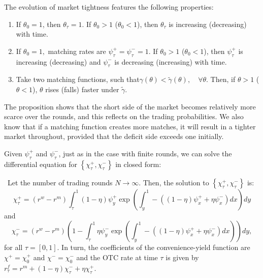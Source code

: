 \documentclass[12pt,american,english,notitlepage]{article}
\begin{document}
\begin{proposition}\label{prop:theta.ode.props}
The evolution of market tightness features the following properties:
\begin{enumerate}
  \renewcommand{\labelenumi}{\roman{enumi}.}

\item If $\theta_{0}=1$, then $\theta_{\tau}=1$. If $\theta_{0}>1$ ($\theta_{0}<1$),
then $\theta_{\tau}$ is increasing (decreasing) with time.
\item If $\theta_{0}=1,$ matching rates are $\psi_{\tau}^{+}=\psi_{\tau}^{-}=1.$
If $\theta_{0}>1$ ($\theta_{0}<1$), then $\psi_{\tau}^{+}$ is increasing
(decreasing) and $\psi_{\tau}^{-}$ is decreasing (increasing) with
time.
\item Take two matching functions, such that$\gamma\left(\theta\right)<\tilde{\gamma}\left(\theta\right),\quad\forall\theta$.
Then, if $\theta>1$ ($\theta<1$), $\theta$ rises (falls) faster
under $\tilde{\gamma}$.
\end{enumerate}
\end{proposition}The proposition shows that the short side of the
market becomes relatively more scarce over the rounds, and this reflects
on the trading probabilities. We also know that if a matching function creates
more matches, it will result in a tighter market throughout, provided
that the deficit side exceeds one initially. 

Given $\psi_{\tau}^{+}$ and $\psi_{\tau}^{-}$, just as in the case with finite rounds, we can solve the differential equation for $\left\{ \chi_{\tau}^{+},\chi_{\tau}^{-}\right\} $
in closed form:
\begin{proposition}\label{P_ContinuousRates}
\ Let the number of trading rounds $N\rightarrow\infty$. Then, the
solution to $\left\{ \chi_{\tau}^{+},\chi_{\tau}^{-}\right\}$ is:
\[
\chi_{\tau}^{+}=\left(r^{w}-r^{m}\right)\int_{\tau}^{1}\left(1-\eta\right)\psi_{y}^{+}\exp\left(\int_{y}^{1}-\left(\left(1-\eta\right)\psi_{x}^{+}+\eta\psi_{x}^{-}\right)dx\right)dy
\] and
\[
\chi_{\tau}^{-}=\left(r^{w}-r^{m}\right)\left(1-\int_{\tau}^{1}\eta\psi_{y}^{-}\exp\left(\int_{y}^{1}-\left(\left(1-\eta\right)\psi_{x}^{+}+\eta\psi_{x}^{-}\right)dx\right)\right)dy,
\]
for all $\tau=\left[0,1\right]$. In turn, the coefficients of the
convenience-yield function are $\chi^{+}=\chi_{0}^{+}$ and $\chi^{-}=\chi_{0}^{-}$
and the OTC rate at time $\tau$ is given by  $r_{\tau}^{f}=r^{m}+\left(1-\eta\right)\chi_{\tau}^{-}+\eta\chi_{\tau}^{+}.$

\end{proposition}
\end{document}
